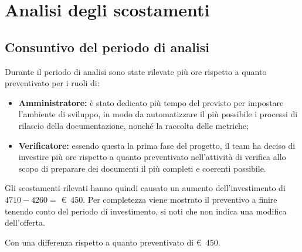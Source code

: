\section{Analisi degli scostamenti} 

\subsection{Consuntivo del periodo di analisi}
    \label{section:consultivo_analisi}
    Durante il periodo di analisi sono state rilevate più ore rispetto a quanto preventivato per i ruoli di:

    \begin{itemize}
        \item \textbf{Amministratore:} è stato dedicato più tempo del previsto per impostare l'ambiente di sviluppo, in modo da automatizzare il più possibile i processi di rilascio della documentazione, nonché la raccolta delle metriche;
        \item \textbf{Verificatore:} essendo questa la prima fase del progetto, il team ha deciso di investire più ore rispetto a quanto preventivato nell'attività di verifica allo scopo di preparare dei documenti il più completi e coerenti possibile.
    \end{itemize}

    \def\salarycontent{
        {Amministratore,$49+\noexpand\textbf{15}=64$,20,1280},
        {Analista,44,25,1100},
        {Progettista,20,22,440},
        {Programmatore,0,15,0},
        {Responsabile,26,30,780},
        {Verificatore,$64+\noexpand\textbf{10}=74$,15,1110},
        {Totale,203,127,4710},
    }
    
    \noindent Gli scostamenti rilevati hanno quindi causato un aumento dell'investimento di $4710 - 4260 =$ \euro\ 450.
    Per completezza viene mostrato il preventivo a finire tenendo conto del periodo di investimento, si noti che non indica una modifica dell'offerta.
    \def\salarycontent{
        {Amministratore,$103+\noexpand\textbf{15}$,20,2360},
        {Analista,85,25,2125},
        {Progettista,212,22,4664},
        {Programmatore,211,15,3165},
        {Responsabile,67,30,2010},
        {Verificatore,$260+\noexpand\textbf{10}$,15,4050},
        {Totale,938,127,18374},
    }
    
    \noindent Con una differenza rispetto a quanto preventivato di \euro\ 450.
